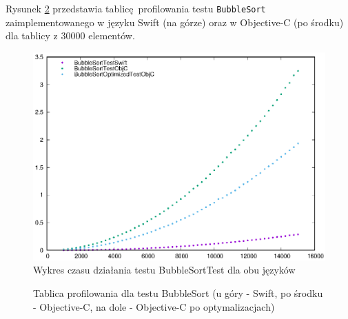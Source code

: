 \documentclass[mgr, shortabstract]{iithesis}
\begin{document}
Rysunek \ref{i:bubble_sort} przedstawia tablicę profilowania testu \texttt{BubbleSort} zaimplementowanego w języku Swift (na górze) oraz w Objective-C (po środku) dla tablicy z 30000 elementów.

\begin{figure}
    \includegraphics{plots/BubbleSort.eps}
    \caption{Wykres czasu działania testu BubbleSortTest dla obu języków}
    \label{p:bubble_sort}
\end{figure}

\begin{figure}
    \caption{Tablica profilowania dla testu BubbleSort (u góry - Swift, po środku - Objective-C, na dole - Objective-C po optymalizacjach)}
    \label{i:bubble_sort}
\end{figure}
\end{document}
